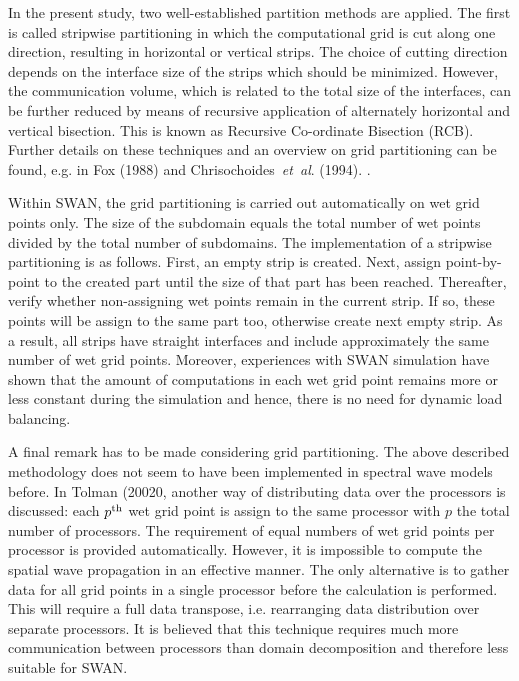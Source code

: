 \documentclass[12pt]{book}
\begin{document}
In the present study, two well-established partition methods are applied. The
first is called stripwise partitioning in which the computational grid is cut
along one direction, resulting in horizontal or vertical strips. The choice of
cutting direction depends on the interface size of the strips which should be
minimized. However, the communication volume, which is related to the total size
of the interfaces, can be further reduced by means of recursive application of
alternately horizontal and vertical bisection. This is known as Recursive
Co-ordinate Bisection (RCB). Further details on these techniques and an overview
on grid partitioning can be found, e.g. in Fox (1988) and Chrisochoides~{\it et~al}. (1994).
\nocite{Fox88,Chr94HR}.

Within SWAN, the grid partitioning is carried out automatically on wet grid points
only. The size of the subdomain equals the total number of wet points divided by
the total number of subdomains. The implementation of a stripwise partitioning is
as follows. First, an empty strip is created. Next, assign point-by-point to the
created part until the size of that part has been reached. Thereafter, verify
whether non-assigning wet points remain in the current strip. If so, these points
will be assign to the same part too, otherwise create next empty strip. As a result,
all strips have straight interfaces and include approximately the same number of wet
grid points. Moreover, experiences with SWAN simulation have shown that the amount
of computations in each wet grid point remains more or less constant during the
simulation and hence, there is no need for dynamic load balancing.

A final remark has to be made considering grid partitioning. The above described
methodology does not seem to have been implemented in spectral wave models before.
In Tolman (20020, another way of distributing data over the processors is discussed:
each $p^{\rm th}$ wet grid point is assign to the same processor with $p$ the total
number of processors. The requirement of equal numbers of wet grid points per processor
is provided automatically. However, it is impossible to compute the spatial wave
propagation in an effective manner. The only alternative is to gather data for all
grid points in a single processor before the calculation is performed. This will
require a full data transpose, i.e. rearranging data distribution over separate
processors. It is believed that this technique requires much more communication between
processors than domain decomposition and therefore less suitable for SWAN.
\end{document}
